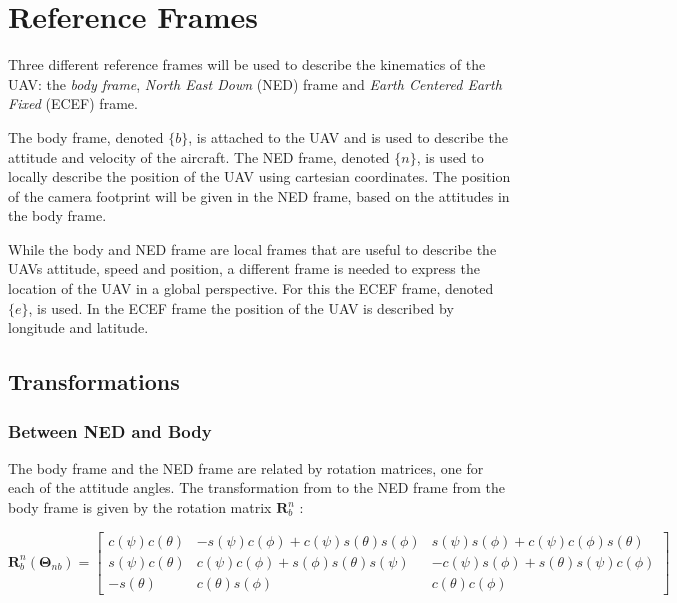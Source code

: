 \section{Reference Frames}

Three different reference frames will be used to describe the kinematics of the UAV: the \textit{body frame}, \textit{North East Down} (NED) frame and \textit{Earth Centered Earth Fixed} (ECEF) frame. 

The body frame, denoted $\{b\}$, is attached to the UAV and is used to describe the attitude and velocity of the aircraft. The NED frame, denoted $\{n\}$, is used to locally describe the position of the UAV using cartesian coordinates. The position of the camera footprint will be given in the NED frame, based on the attitudes in the body frame.

While the body and NED frame are local frames that are useful to describe the UAVs attitude, speed and position, a different frame is needed to express the location of the UAV in a global perspective. For this the ECEF frame, denoted $\{e\}$, is used. In the ECEF frame the position of the UAV is described by longitude and latitude.


\subsection{Transformations}


\subsubsection{Between NED and Body}

The body frame and the NED frame are related by rotation matrices, one for each of the attitude angles. The transformation from to the NED frame from the body frame is given by the rotation matrix $\mathbf{R}_b^n$ \cite{FOSSEN}:

\begin{equation}
	\mathbf{R}_b^n(\bm{\Theta}_{nb}) =
	\begin{bmatrix}
		c(\psi)c(\theta) & -s(\psi)c(\phi)+c(\psi)s(\theta)s(\phi) & s(\psi)s(\phi)+c(\psi)c(\phi)s(\theta) \\
		s(\psi)c(\theta) & c(\psi)c(\phi)+s(\phi)s(\theta)s(\psi) & -c(\psi)s(\phi)+s(\theta)s(\psi)c(\phi) \\
		-s(\theta) & c(\theta)s(\phi) & c(\theta)c(\phi)
	\end{bmatrix}
\end{equation}

